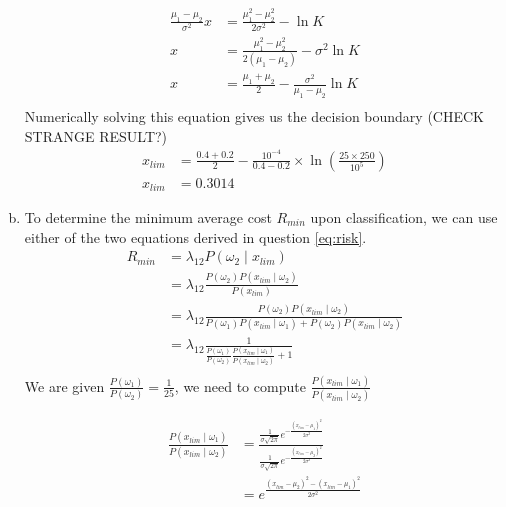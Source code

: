 \documentclass[a4paper, 10pt, twoside]{article}
\begin{document}
\begin{enumerate}[a)]
\begin{align*}
              \frac{\mu_1-\mu_2}{\sigma^2}x                                             & = \frac{\mu_1^2-\mu_2^2}{2\sigma^2} - \ln K                     \\
              x                                                                         & = \frac{\mu_1^2-\mu_2^2}{2(\mu_1-\mu_2)} - \sigma^2\ln K        \\
              x                                                                         & = \frac{\mu_1 + \mu_2}{2} - \frac{\sigma^2}{\mu_1-\mu_2}\ln K   \\
          \end{align*}
          Numerically solving this equation gives us the decision boundary (CHECK STRANGE RESULT?)
          \begin{align*}
              x_{lim} & = \frac{0.4 + 0.2}{2} - \frac{10^{-4}}{0.4-0.2} \times \ln (\frac{25\times250}{10^5}) \\
              x_{lim} & = 0.3014
          \end{align*}
    \item To determine the minimum average cost $R_{min}$ upon classification, we can use either of the two equations derived in question \ref{eq:risk}.
          \begin{align*}
              R_{min} & = \lambda_{12}P(\omega_2 \mid x_{lim})                                                                                              \\
                      & = \lambda_{12}\frac{P(\omega_2)P(x_{lim} \mid \omega_2)}{P(x_{lim})}                                                                \\
                      & = \lambda_{12}\frac{P(\omega_2)P(x_{lim} \mid \omega_2)}{P(\omega_1)P(x_{lim} \mid \omega_1) + P(\omega_2)P(x_{lim} \mid \omega_2)} \\
                      & = \lambda_{12}\frac{1}{\frac{P(\omega_1)}{P(\omega_2)}\frac{P(x_{lim} \mid \omega_1)}{P(x_{lim} \mid \omega_2)} + 1}                \\
          \end{align*}
          We are given $\frac{P(\omega_1)}{P(\omega_2)} = \frac{1}{25}$, we need to compute $\frac{P(x_{lim} \mid \omega_1)}{P(x_{lim} \mid \omega_2)}$

          \begin{align*}
              \frac{P(x_{lim} \mid \omega_1)}{P(x_{lim} \mid \omega_2)} & = \frac{\frac{1}{\sigma\sqrt{2\pi}}e^{-\frac{(x_{lim}-\mu_1)^2}{2\sigma^2}}}{\frac{1}{\sigma\sqrt{2\pi}}e^{-\frac{(x_{lim}-\mu_2)^2}{2\sigma^2}}} \\
                                                                        & = e^{{\frac{(x_{lim}-\mu_2)^2-(x_{lim}-\mu_1)^2}{2\sigma^2}}}
          \end{align*}


\end{enumerate}
\end{document}
